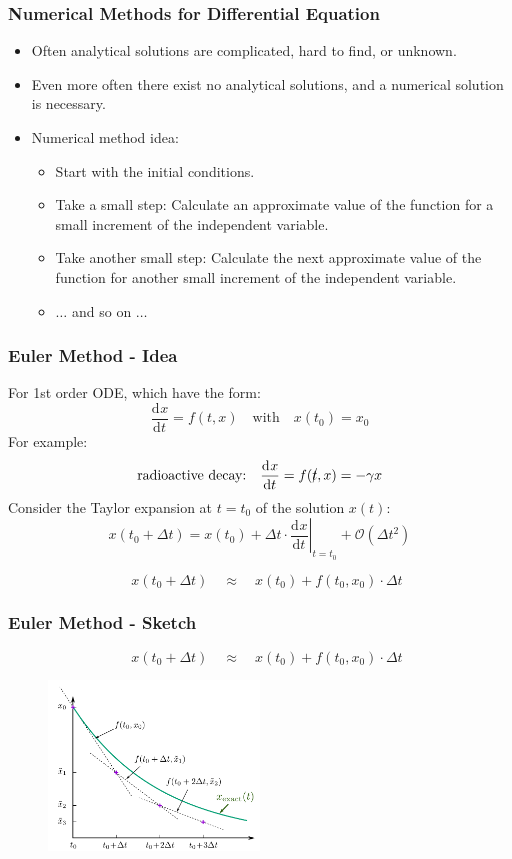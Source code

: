 \documentclass[11pt,aspectratio=169,handout]{beamer}
\newcommand{\dif}[3][]{\frac{\mathrm{d}^{#1}#3}{\mathrm{d}{#2}^{#1}}}
\newcommand{\eval}[2]{\left. #1 \right\vert_{#2}}
\begin{document}
\begin{frame}
\frametitle{Numerical Methods for Differential Equation}
\begin{itemize}
	\item Often analytical solutions are complicated, hard to find, or unknown.
	\pause
	\item Even more often there exist no analytical solutions, and a numerical solution is necessary.
	\pause
	\item Numerical method idea:
	\begin{itemize}
		\item Start with the initial conditions.
		\pause
		\item Take a small step: Calculate an approximate value of the function for a small increment of the independent variable.
		\pause
		\item Take another small step: Calculate the next approximate value of the function for another small increment of the independent variable.
		\item $\ldots$ and so on $\ldots$
	\end{itemize}
\end{itemize}
\end{frame}


\begin{frame}
\frametitle{Euler Method - Idea}
For 1st order ODE, which have the form:
$$ \dif{t}{x} = f(t, x) \quad \text{with} \quad x(t_0) = x_0 $$
\pause
For example:
$$ \text{radioactive decay:} \quad \dif{t}{x} = f(\cancel{t},x) = -\gamma x$$ 
\pause
Consider the Taylor expansion at $t=t_0$ of the solution $x(t)$:
$$ x(t_0+\Delta t) = x(t_0) + \Delta t \cdot \eval{\dif{t}{x}}{t=t_0} + \mathcal{O}(\Delta t^2)$$
\vspace*{-3ex}
\pause
\begin{block}{\vspace*{-3ex}}
	$$ \quad x(t_0+\Delta t) \quad \approx \quad x(t_0) + f(t_0, x_0) \cdot \Delta t$$
\end{block}
\end{frame}


\begin{frame}
\frametitle{Euler Method - Sketch}
\begin{block}{\vspace*{-3ex}}
	$$ \quad x(t_0+\Delta t) \quad \approx \quad x(t_0) + f(t_0, x_0) \cdot \Delta t$$
\end{block}
\begin{figure}
	\centering
	\includegraphics[width=0.5\textwidth]{fig/diffeq-euler}
\end{figure}%
\end{frame}
\end{document}
